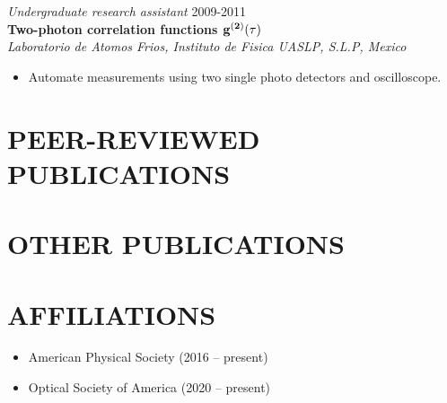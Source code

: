 \documentclass[margin]{res} %
\begin{document}
\begin{resume}
{\sl Undergraduate research assistant} \hfill 2009-2011 \\
{\bf Two-photon correlation functions $\bf g^{(2)}(\tau)$}\\
{\it Laboratorio de Atomos Frios, Instituto de Fisica UASLP, S.L.P, Mexico}
\begin{itemize} \itemsep -2pt
\item Automate measurements using two single photo detectors and oscilloscope.
\end{itemize}
 
\end{resume}

\section{PEER-REVIEWED PUBLICATIONS}

\nocite{*}

\printbibliography[heading=none, keyword={peer}]

\section{OTHER PUBLICATIONS}

\nocite{*}

\printbibliography[heading=none, keyword={npeer}]

\section{AFFILIATIONS}
 
\begin{itemize}
    \item{American Physical Society (2016 -- present)}
    \item{Optical Society of America (2020 -- present)}
\end{itemize}
\end{document}
